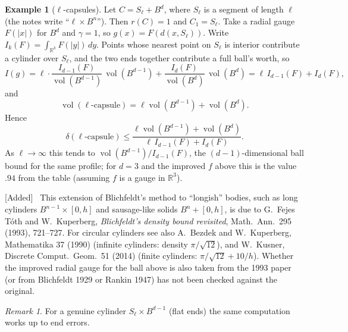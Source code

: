 \documentclass[11pt,openany]{book}
\theoremstyle{plain}
\theoremstyle{definition}
\newtheorem{example}[theorem]{Example}
\theoremstyle{remark}
\newtheorem{remark}[theorem]{Remark}
\newcommand{\added}[1]{{\color{addcol}#1}}
\newenvironment{addedblock}{\par\color{addcol}\noindent\textsf{\small[Added]}\ }{\par}
\newcommand{\R}{\mathbb{R}}
\newcommand{\vol}{\operatorname{vol}}
\newcommand{\abs}[1]{\left\lvert #1 \right\rvert}
\newcommand{\dens}{\delta}             %
\newcommand{\Ball}{B}                  %
\begin{document}
\begin{example}[$\ell$-capsules]\label{L3:ex:capsule}
Let $C=S_\ell+\Ball^d$, where $S_\ell$ is a segment of length $\ell$ \added{(the notes write ``$\ell\times\Ball^n$'')}.
\added{Then $r(C)=1$ and $C_1=S_\ell$. Take a radial gauge $F(\abs x)$ for $\Ball^d$ and $\gamma=1$, so $g(x)=F(d(x,S_\ell))$.
Write $I_k(F)=\int_{\R^k}F(\abs y)\,dy$. Points whose nearest point on $S_\ell$ is interior contribute a cylinder over $S_\ell$, and the two
ends together contribute a full ball's worth, so}
\[
  I(g)=\ell\cdot\frac{I_{d-1}(F)}{\vol(\Ball^{d-1})}\,\vol(\Ball^{d-1})+\frac{I_d(F)}{\vol(\Ball^d)}\,\vol(\Ball^d)
  =\ell\,I_{d-1}(F)+I_d(F),
\]
and
\[
  \vol(\ell\text{-capsule})=\ell\vol(\Ball^{d-1})+\vol(\Ball^d).
\]
Hence
\[
  \dens(\ell\text{-capsule})\le\frac{\ell\vol(\Ball^{d-1})+\vol(\Ball^d)}{\ell\,I_{d-1}(F)+I_d(F)}.
\]
\added{As $\ell\to\infty$ this tends to $\vol(\Ball^{d-1})/I_{d-1}(F)$, the $(d-1)$-dimensional ball bound for the same profile; for $d=3$ and
the improved $f$ above this is the value $.94$ from the table (assuming $f$ is a gauge in $\R^3$).}
\end{example}

\begin{addedblock}
This extension of Blichfeldt's method to ``longish'' bodies, such as long cylinders
$\Ball^{n-1}\times[0,h]$ and sausage-like solids $\Ball^n+[0,h]$, is due to G.~Fejes T\'oth and
W.~Kuperberg, \emph{Blichfeldt's density bound revisited}, Math.\ Ann.\ 295 (1993), 721--727. For
circular cylinders see also A.~Bezdek and W.~Kuperberg, Mathematika 37 (1990) (infinite cylinders:
density $\pi/\sqrt{12}$), and W.~Kusner, Discrete Comput.\ Geom.\ 51 (2014) (finite cylinders:
$\pi/\sqrt{12}+10/h$). Whether the improved radial gauge for the ball above is also taken from the 1993
paper (or from Blichfeldt 1929 or Rankin 1947) has not been checked against the original.
\end{addedblock}

\begin{remark}
\added{For a genuine cylinder $S_\ell\times\Ball^{d-1}$ (flat ends) the same computation works up to} end errors.
\end{remark}
\end{document}
